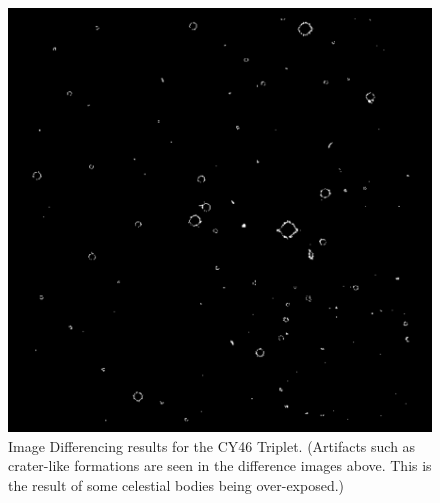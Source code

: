 \begin{figure}
\endminipage\hfill
{}
  \includegraphics[width=\linewidth]{Figures/NEATImageDiff3.pdf}
\endminipage
\caption{Image Differencing results for the CY46 Triplet. (Artifacts such as crater-like formations are seen in the difference images above. This is the result of some celestial bodies being over-exposed.)}
\label{fig:NEAT_ImgDiff1}
\end{figure}

